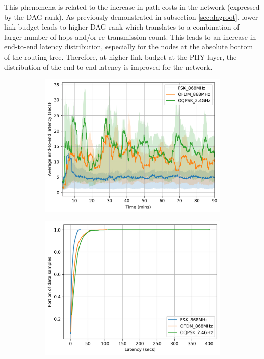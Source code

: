 \documentclass[journal]{IEEEtran}
\begin{document}

This phenomena is related to the increase in path-costs in the network (expressed by the DAG rank).
As previously demonstrated in subsection \ref{sec:dagroot}, lower link-budget leads to higher DAG rank which translates to a combination of larger-number of hops and/or re-transmission count.
This leads to an increase in end-to-end latency distribution, especially for the nodes at the absolute bottom of the routing tree. 
Therefore, at higher link budget at the PHY-layer, the distribution of the end-to-end latency is improved for the network.

\begin{figure}
	\centering
	\begin{subfigure}{0.6\columnwidth}
	\centering
	\includegraphics[width=1\columnwidth]{latency_time}
    \label{fig:latency_time}
	\end{subfigure}
	\begin{subfigure}{0.6\columnwidth}
		\centering
    	\includegraphics[width=01\columnwidth]{latency_cdf}

\end{subfigure}
\end{figure}
\end{document}
